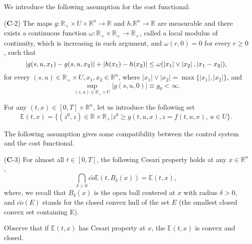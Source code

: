 We introduce the following assumption for the cost functional:
\begin{asparaenum}\label{Cond:C2}
    \item[(\textbf{C}-2)]
        The maps $g:\mathbb{R}_{+}\times U\times \mathbb{R}^n\to \mathbb{R}$
        and $h.\mathbb{R}^n\to \mathbb{R}$ are measurable and there exists 
        a continuous function $\omega:\mathbb{R}_{+}\times\mathbb{R}_{+}\to %
        \mathbb{R}_{+}$, called a local modulus of continuity, which is increasing 
        in each argument, and $\omega(r,0)=0$ for every $r\geq 0$, such that 
        $$
            \abs{g(s,u,x_1)-g(s,u,x_2)} +\abs{h(x_1)-h(x_2)}\leq \omega(\abs{x_1}%
            \vee \abs{x_2},\abs{x_1-x_2}),
        $$
        for every $ (s,u)\in \mathbb{R}_{+}\times U,x_1,x_2\in \mathbb{R}^n$, where 
        $|x_1|\vee |x_2|=\max\{|x_1|,|x_2|\}$, and
        $$
            \sup_{(s,u)\in \mathbb{R}_{+}\times U}|g(s,u,0)|\equiv g_0<\infty.
        $$
\end{asparaenum}


    For any $(t,x)\in [0,T]\times\mathbb{R}^n$, let us introduce the following set
    $$
        \mathbb{E}(t,x)=\{(z^0,z)\in \mathbb{R}\times \mathbb{R}_{+}|z^0    %
        \geq g(t,u,x),z=f(t,u,x),\, u\in U\}.
    $$
    
    The following assumption gives some compatibility between the control system 
    and the cost functional.

    \begin{asparaenum}\label{Cond:C3}
        \item[(\textbf{C}-3)]
            For almost all $t\in [0,T]$, the following Cesari property holds at any
            $x\in \mathbb{R}^n$,
            $$
                \bigcap_{\delta>0}\bar{co}\mathbb{E}(t,B_{\delta}(x))=\mathbb{E}(t,x),
            $$
            where, we recall that $B_{\delta}(x)$ is the open ball centered at $x$ 
            with radius $\delta>0$, and $\bar{co}(E)$ stands for the closed convex 
            hull of the set $E$ (the smallest closed convex set containing E).
    \end{asparaenum}
    Observe that if $\mathbb{E}(t,x)$ has Cesari property at $x$, the $\mathbb{E}(t,x)$ 
    is convex and closed.

